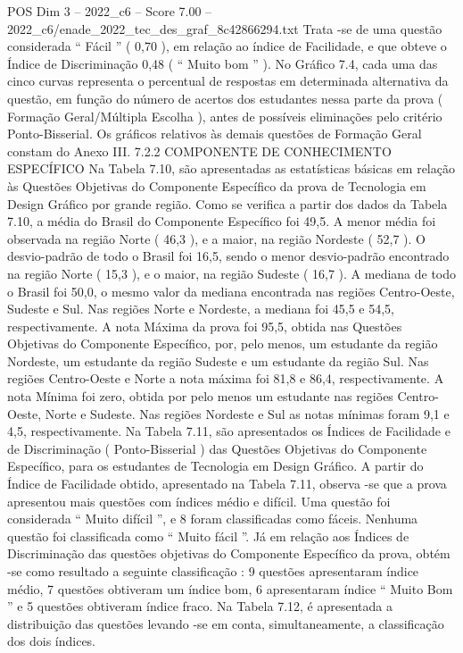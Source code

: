 \begin{textsample}{POS Dim 3 – 2022\_c6 – Score 7.00 – 2022\_c6/enade\_2022\_tec\_des\_graf\_8c42866294.txt}
Trata -se de uma questão considerada “ Fácil ” ( 0,70 ), em relação ao índice de Facilidade, e que obteve o Índice de Discriminação 0,48 ( “ Muito bom ” ).
No Gráfico 7.4, cada uma das cinco curvas representa o percentual de respostas em determinada alternativa da questão, em função do número de acertos dos estudantes nessa parte da prova ( Formação Geral/Múltipla Escolha ), antes de possíveis eliminações pelo critério Ponto-Bisserial.
Os gráficos relativos às demais questões de Formação Geral constam do Anexo III. 7.2.2 COMPONENTE DE CONHECIMENTO ESPECÍFICO Na Tabela 7.10, são apresentadas as estatísticas básicas em relação às Questões Objetivas do Componente Específico da prova de Tecnologia em Design Gráfico por grande região.
Como se verifica a partir dos dados da Tabela 7.10, a média do Brasil do Componente Específico foi 49,5.
A menor média foi observada na região Norte ( 46,3 ), e a maior, na região Nordeste ( 52,7 ).
O desvio-padrão de todo o Brasil foi 16,5, sendo o menor desvio-padrão encontrado na região Norte ( 15,3 ), e o maior, na região Sudeste ( 16,7 ).
A mediana de todo o Brasil foi 50,0, o mesmo valor da mediana encontrada nas regiões Centro-Oeste, Sudeste e Sul.
Nas regiões Norte e Nordeste, a mediana foi 45,5 e 54,5, respectivamente.
A nota Máxima da prova foi 95,5, obtida nas Questões Objetivas do Componente Específico, por, pelo menos, um estudante da região Nordeste, um estudante da região Sudeste e um estudante da região Sul.
Nas regiões Centro-Oeste e Norte a nota máxima foi 81,8 e 86,4, respectivamente.
A nota Mínima foi zero, obtida por pelo menos um estudante nas regiões Centro-Oeste, Norte e Sudeste.
Nas regiões Nordeste e Sul as notas mínimas foram 9,1 e 4,5, respectivamente.
Na Tabela 7.11, são apresentados os Índices de Facilidade e de Discriminação ( Ponto-Bisserial ) das Questões Objetivas do Componente Específico, para os estudantes de Tecnologia em Design Gráfico.
A partir do Índice de Facilidade obtido, apresentado na Tabela 7.11, observa -se que a prova apresentou mais questões com índices médio e difícil.
Uma questão foi considerada “ Muito difícil ”, e 8 foram classificadas como fáceis.
Nenhuma questão foi classificada como “ Muito fácil ”.
Já em relação aos Índices de Discriminação das questões objetivas do Componente Específico da prova, obtém -se como resultado a seguinte classificação : 9 questões apresentaram índice médio, 7 questões obtiveram um índice bom, 6 apresentaram índice “ Muito Bom ” e 5 questões obtiveram índice fraco.
Na Tabela 7.12, é apresentada a distribuição das questões levando -se em conta, simultaneamente, a classificação dos dois índices.

\end{textsample}
